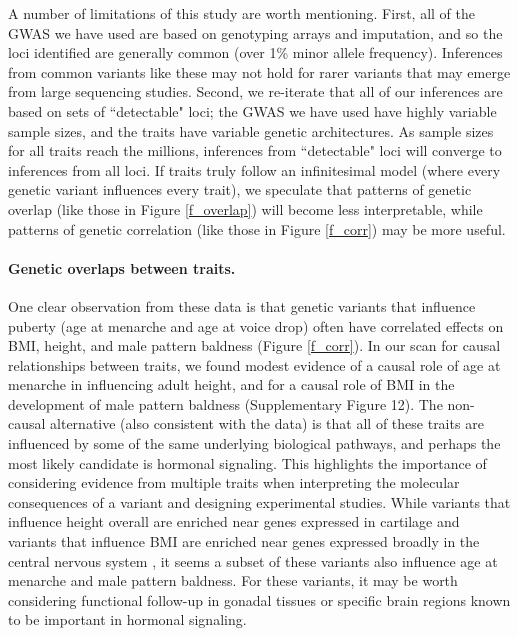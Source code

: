 \documentclass[11pt,titlepage]{article}
\begin{document}
A number of limitations of this study are worth mentioning. First, all of the GWAS we have used are based on genotyping arrays and imputation, and so the loci identified are generally common (over 1\% minor allele frequency). Inferences from common variants like these may not hold for rarer variants that may emerge from large sequencing studies. Second, we re-iterate that all of our inferences are based on sets of ``detectable" loci; the GWAS we have used have highly variable sample sizes, and the traits have variable genetic architectures. As sample sizes for all traits reach the millions, inferences from ``detectable" loci will converge to inferences from all loci. If traits truly follow an infinitesimal model (where every genetic variant influences every trait), we speculate that patterns of genetic overlap (like those in Figure \ref{f_overlap}) will become less interpretable, while patterns of genetic correlation (like those in Figure \ref{f_corr}) may be more useful.

\paragraph{Genetic overlaps between traits.}
One clear observation from these data is that genetic variants that influence puberty (age at menarche and age at voice drop) often have correlated effects on BMI, height, and male pattern baldness (Figure \ref{f_corr}). 
In our scan for causal relationships between traits, we found modest evidence of a causal role of age at menarche in influencing adult height, and for a causal role of BMI in the development of male pattern baldness (Supplementary Figure 12). 
The non-causal alternative (also consistent with the data) is that all of these traits are influenced by some of the same underlying biological pathways, and perhaps the most likely candidate is hormonal signaling. 
This highlights the importance of considering evidence from multiple traits when interpreting the molecular consequences of a variant and designing experimental studies. 
While variants that influence height overall are enriched near genes expressed in cartilage \citep{Wood:2014aa} and variants that influence BMI are enriched near genes expressed broadly in the central nervous system \citep{Locke:2015aa}, it seems a subset of these variants also influence age at menarche and male pattern baldness. 
For these variants, it may be worth considering functional follow-up in gonadal tissues or specific brain regions known to be important in hormonal signaling.
\end{document}
